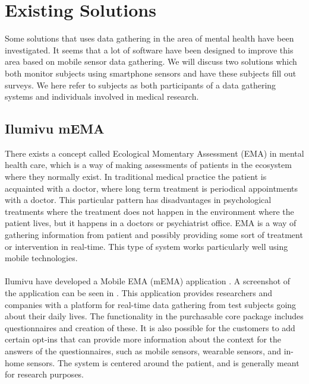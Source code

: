 
\section{Existing Solutions}
\label{sec:existing_solutions}

Some solutions that uses data gathering in the area of mental health have been investigated. It seems that a lot of software have been designed to improve this area based on mobile sensor data gathering. We will discuss two solutions which both monitor subjects using smartphone sensors and have these subjects fill out surveys. We here refer to subjects as both participants of a data gathering systems and individuals involved in medical research.

\subsection{Ilumivu mEMA}
\label{sub:ilumivu_mema}
There exists a concept called Ecological Momentary Assessment (EMA) \parencite{shiffman2008ecological} in mental health care, which is a way of making assessments of patients in the ecosystem where they normally exist. In traditional medical practice the patient is acquainted with a doctor, where long term treatment is periodical appointments with a doctor. This particular pattern has disadvantages in psychological treatments where the treatment does not happen in the environment where the patient lives, but it happens in a doctors or psychiatrist office. EMA is a way of gathering information from patient and possibly providing some sort of treatment or intervention in real-time. This type of system works particularly well using mobile technologies.
\\\\
Ilumivu have developed a Mobile EMA (mEMA) application \parencite{lumivu}. A screenshot of the application can be seen in . This application provides researchers and companies with a platform for real-time data gathering from test subjects going about their daily lives. The functionality in the purchasable core package includes questionnaires and creation of these. It is also possible for the customers to add certain opt-ins that can provide more information about the context for the answers of the questionnaires, such as mobile sensors, wearable sensors, and in-home sensors. The system is centered around the patient, and is generally meant for research purposes.

